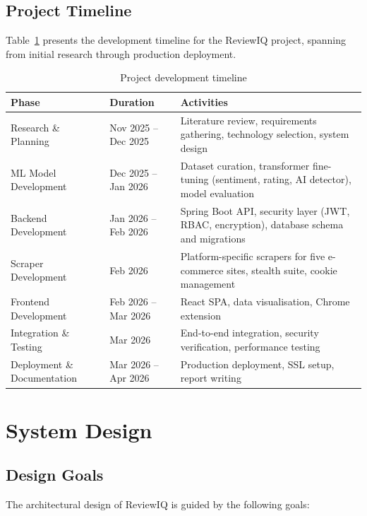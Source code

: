 \documentclass[12pt,a4paper,oneside]{report}
\begin{document}
\section{Project Timeline}
Table~\ref{tab:timeline} presents the development timeline for the
ReviewIQ project, spanning from initial research through production
deployment.

\begin{table}[ht]
\centering
\caption{Project development timeline}
\label{tab:timeline}
\begin{tabularx}{\textwidth}{l l X}
\toprule
\textbf{Phase} & \textbf{Duration} & \textbf{Activities} \\
\midrule
Research \& Planning      & Nov 2025 -- Dec 2025 & Literature review, requirements gathering, technology selection, system design \\
ML Model Development      & Dec 2025 -- Jan 2026 & Dataset curation, transformer fine-tuning (sentiment, rating, AI detector), model evaluation \\
Backend Development       & Jan 2026 -- Feb 2026 & Spring Boot API, security layer (JWT, RBAC, encryption), database schema and migrations \\
Scraper Development       & Feb 2026             & Platform-specific scrapers for five e-commerce sites, stealth suite, cookie management \\
Frontend Development      & Feb 2026 -- Mar 2026 & React SPA, data visualisation, Chrome extension \\
Integration \& Testing    & Mar 2026             & End-to-end integration, security verification, performance testing \\
Deployment \& Documentation & Mar 2026 -- Apr 2026 & Production deployment, SSL setup, report writing \\
\bottomrule
\end{tabularx}
\end{table}

\chapter{System Design}

\section{Design Goals}
The architectural design of ReviewIQ is guided by the following goals:
\end{document}
